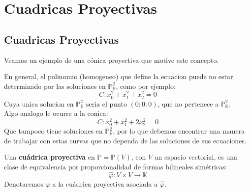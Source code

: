 \section{Cuadricas Proyectivas}
\subsection{Cuadricas Proyectivas}

Veamos un ejemplo de una cónica proyectiva que motive este concepto.


En general, el polinomio (homogeneo) que define la ecuacion puede no estar determinado por las soluciones en $\mathbb{P}_{\mathbb{R}}^2$, como por ejemplo:
\[
C : x_0^2 + x_1^2 + x_2^2 = 0
\]
Cuya unica solucion en $\mathbb{P}_{\mathbb{R}}^2$ seria el punto $(0 : 0 : 0)$, que no pertenece a $\mathbb{P}_{\mathbb{R}}^2$.\\
Algo analogo le ocurre a la conica:
\[
C : x_0^2 + x_1^2 + 2x_2^2 = 0
\]
Que tampoco tiene soluciones en $\mathbb{P}_{\mathbb{R}}^2$, por lo que debemos encontrar una manera de trabajar con estas curvas que no dependa de las soluciones de sus ecuaciones.\\

\begin{definición}
    Una \textbf{cuádrica proyectiva} en $\mathbb{P}=\mathbb{P} (V)$, con $V$ un espacio vectorial, es una clase de equivalencia por proporcionalidad de formas bilineales simétricas:
    \[
    \hat{\varphi} : V \times V \to \mathbb{K}
    \]
    Denotaremos $\varphi$ a la cuádrica proyectiva asociada a $\hat{\varphi}$.
\end{definición}

